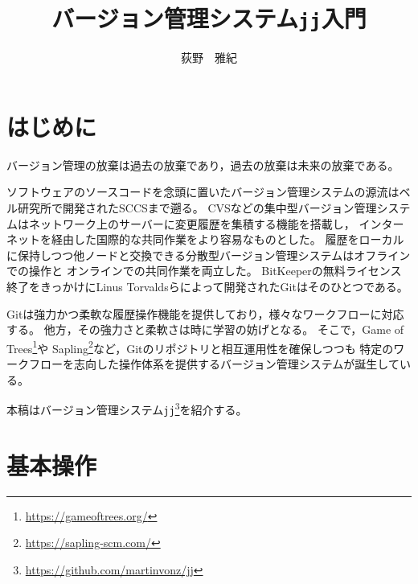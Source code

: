 \documentclass[b5j,twocolumn]{ltjsarticle}
\title{バージョン管理システム\texttt{jj}入門}
\author{荻野　雅紀}
\date{}
\begin{document}
\pagestyle{empty}
\maketitle

\section{はじめに}

バージョン管理の放棄は過去の放棄であり，過去の放棄は未来の放棄である。

ソフトウェアのソースコードを念頭に置いたバージョン管理システムの源流はベル研究所で開発されたSCCSまで遡る。
CVSなどの集中型バージョン管理システムはネットワーク上のサーバーに変更履歴を集積する機能を搭載し，
インターネットを経由した国際的な共同作業をより容易なものとした。
履歴をローカルに保持しつつ他ノードと交換できる分散型バージョン管理システムはオフラインでの操作と
オンラインでの共同作業を両立した。
BitKeeperの無料ライセンス終了をきっかけにLinus Torvaldsらによって開発されたGitはそのひとつである。

Gitは強力かつ柔軟な履歴操作機能を提供しており，様々なワークフローに対応する。
他方，その強力さと柔軟さは時に学習の妨げとなる。
そこで，Game of Trees\footnote{\url{https://gameoftrees.org/}}や
Sapling\footnote{\url{https://sapling-scm.com/}}など，Gitのリポジトリと相互運用性を確保しつつも
特定のワークフローを志向した操作体系を提供するバージョン管理システムが誕生している。

本稿はバージョン管理システム\texttt{jj}\footnote{\url{https://github.com/martinvonz/jj}}を紹介する。

\newpage

\section{基本操作}
\end{document}
